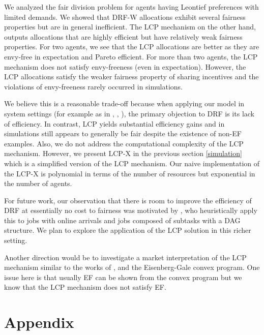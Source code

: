 \documentclass[letterpaper]{article} %
\theoremstyle{definition}
\begin{document}

We analyzed the fair division problem for agents having Leontief preferences with limited demands. We showed that DRF-W allocations exhibit several fairness properties but are in general inefficient. The LCP mechanism on the other hand, outputs allocations that are highly efficient but have relatively weak fairness properties. For two agents, we see that the LCP allocations are better as they are envy-free in expectation and Pareto efficient. For more than two agents, the LCP mechanism does not satisfy envy-freeness (even in expectation). However, the LCP allocations satisfy the weaker fairness property of sharing incentives and the violations of envy-freeness rarely occurred in simulations.
 
We believe this is a reasonable trade-off because when applying our model in system settings (for example as in \citet{Grandl2016Carbyne}, \citet{Hindman2011Mesos}, \citet{vavilapalli2013apacheHadoopYARN}), the primary objection to DRF is its lack of efficiency. In contrast, LCP yields substantial efficiency gains and in simulations still appears to generally be fair despite the existence of non-EF examples. Also, we do not address the computational complexity of the LCP mechanism. However, we present LCP-X in the previous section \ref{simulation} which is a simplified version of the LCP mechanism. Our naive implementation of the LCP-X is polynomial in terms of the number of resources but exponential in the number of agents.

For future work, our observation that there is room to improve the efficiency of DRF at essentially no cost to fairness was motivated by \citet{Grandl2016Carbyne}, who heuristically apply this to jobs with online arrivals and jobs composed of subtasks with a DAG structure.  We plan to explore the application of the LCP solution in this richer setting.


Another direction would be to investigate a market interpretation of the LCP mechanism similar to the works of \citet{goel2019markets}, and the Eisenberg-Gale convex program. One issue here is that usually EF can be shown from the convex program but we know that the LCP mechanism does not satisfy EF.






\clearpage
\newpage



\section{Appendix}
\end{document}
